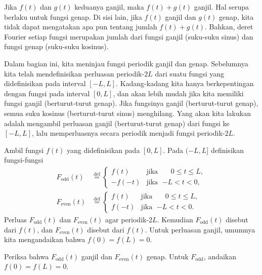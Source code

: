 Jika $f(t)$ dan $g(t)$ keduanya ganjil, maka $f(t)+g(t)$ ganjil.  Hal serupa berlaku untuk
fungsi genap.  Di sisi lain,
jika $f(t)$ ganjil dan $g(t)$ genap, kita tidak dapat mengatakan apa pun tentang
jumlah
$f(t) + g(t)$.  Bahkan, deret Fourier setiap fungsi merupakan jumlah dari
fungsi ganjil (suku-suku sinus) dan fungsi genap (suku-suku kosinus).

Dalam bagian ini, kita meninjau fungsi periodik ganjil dan genap.
Sebelumnya kita telah mendefinisikan perluasan periodik-$2L$
dari suatu fungsi yang didefinisikan pada interval $[-L,L]$.  Kadang-kadang kita hanya
berkepentingan dengan fungsi pada interval $[0,L]$, dan akan lebih mudah
jika kita memiliki fungsi ganjil (berturut-turut genap).  Jika fungsinya ganjil (berturut-turut genap),
semua suku kosinus (berturut-turut sinus) menghilang.
Yang akan kita lakukan adalah
mengambil
perluasan ganjil (berturut-turut genap) dari fungsi ke $[-L,L]$, lalu 
memperluasnya secara periodik menjadi fungsi periodik-$2L$.

Ambil fungsi $f(t)$ yang didefinisikan pada $[0,L]$.  Pada $(-L,L]$ definisikan fungsi-fungsi
\begin{align*}
F_{\text{odd}}(t) & \overset{\text{def}}{=}
\begin{cases}
f(t) & \text{jika } \; \phantom{-}0 \leq t \leq L , \\
-f(-t) & \text{jika } \; {-L} < t < 0 ,
\end{cases}
\\
F_{\text{even}}(t) & \overset{\text{def}}{=}
\begin{cases}
f(t) & \text{jika } \; \phantom{-}0 \leq t \leq L , \\
f(-t) & \text{jika } \; {-L} < t < 0 .
\end{cases}
\end{align*}
Perluas $F_{\text{odd}}(t)$ dan $F_{\text{even}}(t)$ agar periodik-$2L$.
Kemudian
$F_{\text{odd}}(t)$ disebut
\emph{} dari $f(t)$, dan
$F_{\text{even}}(t)$ disebut
\emph{} dari $f(t)$.
Untuk perluasan ganjil, umumnya kita mengandaikan bahwa $f(0) = f(L) = 0$.

\begin{exercise}
Periksa bahwa $F_{\text{odd}}(t)$ ganjil dan $F_{\text{even}}(t)$ genap.
Untuk $F_{\text{odd}}$,
andaikan $f(0) = f(L) = 0$.
\end{exercise}

